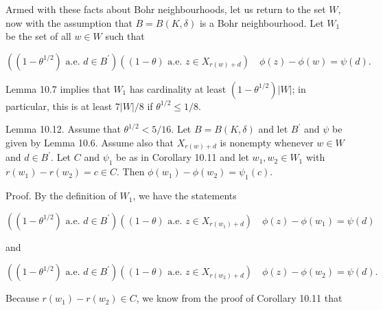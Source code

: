 \documentclass[10pt]{article}
\begin{document}
Armed with these facts about Bohr neighbourhoods, let us return to the set $W$, now with the assumption that $B=B(K, \delta)$ is a Bohr neighbourhood. Let $W_{1}$ be the set of all $w \in W$ such that

$$
\left(\left(1-\theta^{1 / 2}\right) \text { a.e. } d \in B^{\prime}\right)\left((1-\theta) \text { a.e. } z \in X_{r(w)+d}\right) \quad \phi(z)-\phi(w)=\psi(d) .
$$

Lemma 10.7 implies that $W_{1}$ has cardinality at least $(1-\theta^{1/2})|W|$; in particular, this is at least $7|W|/8$ if $\theta^{1/2}\leqslant1/8$.

Lemma 10.12. Assume that $\theta^{1 / 2} < 5 / 16$. Let $B=B(K, \delta)$ and let $B^{\prime}$ and $\psi$ be given by Lemma 10.6. Assume also that $X_{r(w)+d}$ is nonempty whenever $w\in W$ and $d\in B^{\prime}$. Let $C$ and $\psi_{1}$ be as in Corollary 10.11 and let $w_{1}, w_{2} \in W_{1}$ with $r\left(w_{1}\right)-r\left(w_{2}\right)=c \in C$. Then $\phi\left(w_{1}\right)-\phi\left(w_{2}\right)=\psi_{1}(c)$.

Proof. By the definition of $W_{1}$, we have the statements


\begin{equation*}
\left((1-\theta^{1/2}) \text { a.e. } d \in B^{\prime}\right)\left((1-\theta) \text { a.e. } z \in X_{r\left(w_{1}\right)+d}\right) \quad \phi(z)-\phi\left(w_{1}\right)=\psi(d) \tag{1}
\end{equation*}


and


\begin{equation*}
\left((1-\theta^{1/2}) \text { a.e. } d \in B^{\prime}\right)\left((1-\theta) \text { a.e. } z \in X_{r\left(w_{2}\right)+d}\right) \quad \phi(z)-\phi\left(w_{2}\right)=\psi(d) \text {. } \tag{2}
\end{equation*}


Because $r\left(w_{1}\right)-r\left(w_{2}\right) \in C$, we know from the proof of Corollary 10.11 that
\end{document}
